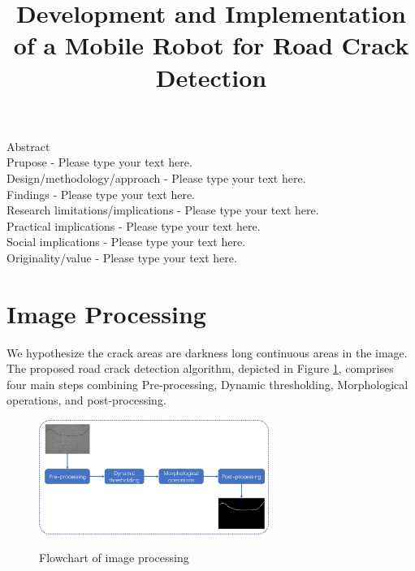 \documentclass[twocolumn]{article}
\title{Development and Implementation of a Mobile Robot for Road Crack Detection}
\begin{document}
\maketitle
    \begin{strip}
        Abstract\\
        Prupose - Please type your text here.\\
        Design/methodology/approach - Please type your text here.\\
        Findings - Please type your text here.\\
        Research limitations/implications - Please type your text here.\\
        Practical implications - Please type your text here.\\
        Social implications - Please type your text here.\\
        Originality/value - Please type your text here.\\
    \end{strip}
       
    \section{Image Processing}
        We hypothesize the crack areas are darkness long continuous areas in the image. The proposed road crack detection algorithm, depicted in Figure \ref{Flowchart of image processing}, 
        comprises four main steps combining Pre-processing, Dynamic thresholding, Morphological operations, and post-processing.\\  

        \begin{figure}[h]
            \centering
            \includegraphics[width=7.5cm]{image//Flowchart_image.png}\\
            \caption{Flowchart of image processing}\label{Flowchart of image processing}
            \end{figure}
        
\end{document}
